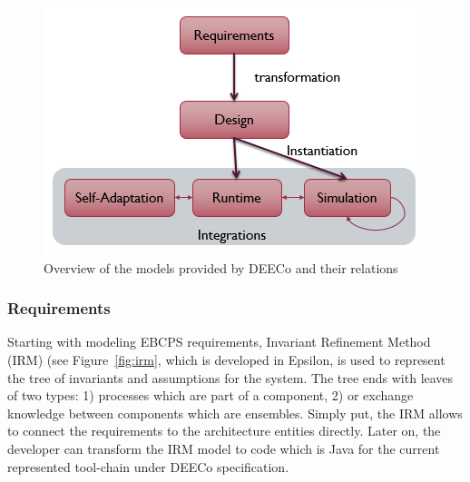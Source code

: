 \begin{figure}[!h]
\centering
\includegraphics[width=\textwidth]{figures/deeco_map.PNG}
\caption{Overview of the models provided by DEECo and their relations}
\label{fig:deeco_map}
\end{figure}

\subsubsection{Requirements}
Starting with modeling EBCPS requirements, Invariant Refinement Method (IRM) \cite{Keznikl:2013:DEC:2465449.2465457} (see  Figure~\ref{fig:irm}, which is developed in Epsilon, is used to represent the tree of invariants and assumptions for the system. The tree ends with leaves of two types: 1) processes which are part of a component, 2) or exchange knowledge between components which are ensembles. Simply put, the IRM allows to connect the requirements to the architecture entities directly. Later on, the developer can transform the IRM model to code which is Java for the current represented tool-chain under DEECo specification.

